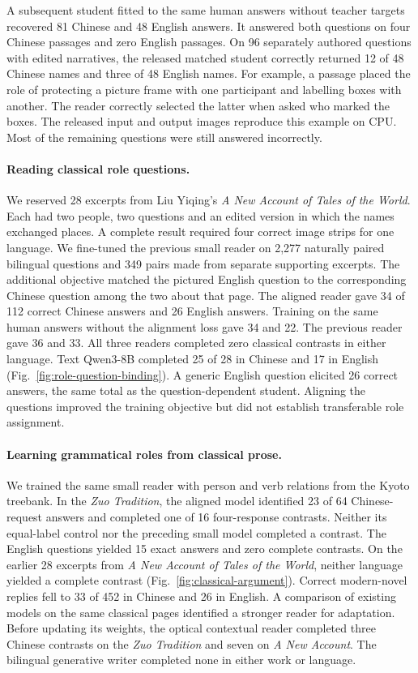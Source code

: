 \documentclass[12pt,a4paper]{article}
\providecommand{\DIFadd}[1]{{\protect\color{blue} \sf #1}} %
\begin{document}
\DIFadd{A subsequent student fitted to the same human answers without teacher targets recovered 81 Chinese and 48 English answers. It answered both questions on four Chinese passages and zero English passages. On 96 separately authored questions with edited narratives, the released matched student correctly returned 12 of 48 Chinese names and three of 48 English names. For example, a passage placed the role of protecting a picture frame with one participant and labelling boxes with another. The reader correctly selected the latter when asked who marked the boxes. The released input and output images reproduce this example on CPU. Most of the remaining questions were still answered incorrectly.
}

\paragraph{\DIFadd{Reading classical role questions.}}
\DIFadd{We reserved 28 excerpts from Liu Yiqing's \textit{A New Account of Tales of the World}. Each had two people, two questions and an edited version in which the names exchanged places. A complete result required four correct image strips for one language. We fine-tuned the previous small reader on 2,277 naturally paired bilingual questions and 349 pairs made from separate supporting excerpts. The additional objective matched the pictured English question to the corresponding Chinese question among the two about that page. The aligned reader gave 34 of 112 correct Chinese answers and 26 English answers. Training on the same human answers without the alignment loss gave 34 and 22. The previous reader gave 36 and 33. All three readers completed zero classical contrasts in either language. Text Qwen3-8B completed 25 of 28 in Chinese and 17 in English (Fig.~\ref{fig:role-question-binding}). A generic English question elicited 26 correct answers, the same total as the question-dependent student. Aligning the questions improved the training objective but did not establish transferable role assignment.
}

\paragraph{\DIFadd{Learning grammatical roles from classical prose.}}
\DIFadd{We trained the same small reader with person and verb relations from the Kyoto treebank. In the \textit{Zuo Tradition}, the aligned model identified 23 of 64 Chinese-request answers and completed one of 16 four-response contrasts. Neither its equal-label control nor the preceding small model completed a contrast. The English questions yielded 15 exact answers and zero complete contrasts. On the earlier 28 excerpts from \textit{A New Account of Tales of the World}, neither language yielded a complete contrast (Fig.~\ref{fig:classical-argument}). Correct modern-novel replies fell to 33 of 452 in Chinese and 26 in English. A comparison of existing models on the same classical pages identified a stronger reader for adaptation. Before updating its weights, the optical contextual reader completed three Chinese contrasts on the \textit{Zuo Tradition} and seven on \textit{A New Account}. The bilingual generative writer completed none in either work or language.
}
\end{document}
